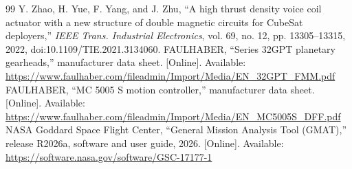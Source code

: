 \documentclass[conference]{IEEEtran}
\begin{document}
\begin{thebibliography}{99}
 Y. Zhao, H. Yue, F. Yang, and J. Zhu, ``A high thrust density voice coil actuator with a new structure of double magnetic circuits for CubeSat deployers,'' \emph{IEEE Trans. Industrial Electronics}, vol. 69, no. 12, pp. 13305--13315, 2022, doi:10.1109/TIE.2021.3134060.
 FAULHABER, ``Series 32GPT planetary gearheads,'' manufacturer data sheet. [Online]. Available: \url{https://www.faulhaber.com/fileadmin/Import/Media/EN_32GPT_FMM.pdf}
 FAULHABER, ``MC 5005 S motion controller,'' manufacturer data sheet. [Online]. Available: \url{https://www.faulhaber.com/fileadmin/Import/Media/EN_MC5005S_DFF.pdf}
 NASA Goddard Space Flight Center, ``General Mission Analysis Tool (GMAT),'' release R2026a, software and user guide, 2026. [Online]. Available: \url{https://software.nasa.gov/software/GSC-17177-1}
\end{thebibliography}
\end{document}
